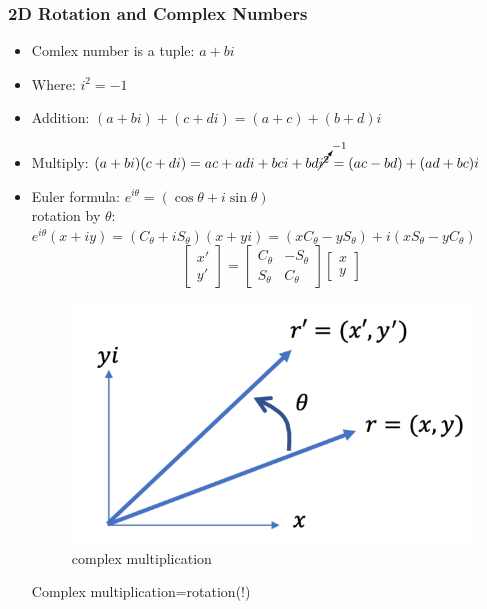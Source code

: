 \documentclass{article}
\begin{document}
\subsubsection{2D Rotation and Complex Numbers}
\begin{itemize}
    \item Comlex number is a tuple: $a+bi$
    \item Where: $i^{2}=-1$
    \item Addition: $(a+bi)+(c+di) = (a+c) + (b+d)i$
    \item Multiply: $ (a+bi)(c+di) = ac + adi + bci +bd\cancelto{-1}{i^2} = (ac-bd)+(ad+bc)i  $
    \item Euler formula: $e^{i\theta} = ( \cos{\theta} + i\sin{\theta})$ \\
    rotation by $\theta$: \\
    $ e^{i\theta}(x+iy) = (C_{\theta}+iS_{\theta})(x+yi)=(xC_\theta-yS_{\theta} )+i(xS_\theta-yC_{\theta} ) $\\
    $$ \begin{bmatrix}
    x'\\y'
    \end{bmatrix}
    =
    \begin{bmatrix}
    C_{\theta} & -S_{\theta} \\
    S_{\theta} & C_{\theta}
    \end{bmatrix}
    \begin{bmatrix}
    x\\y
    \end{bmatrix}
    $$
    \begin{figure}[h!]
    \centering
    \includegraphics[scale=0.9]{complexMul.png}
    \caption{complex multiplication}
    \label{fig:sr}
    \end{figure}
    Complex multiplication=rotation(!)
\end{itemize}
\end{document}
